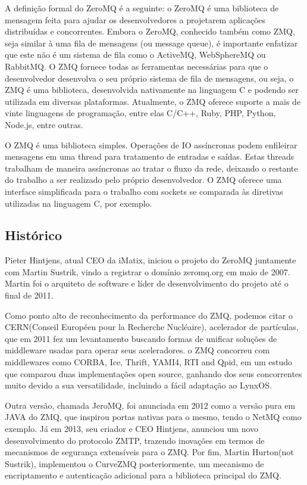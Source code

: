 \documentclass[12pt]{article}
\begin{document}
	A definição formal do ZeroMQ é a seguinte: o ZeroMQ é uma biblioteca de mensagem feita para ajudar os desenvolvedores a projetarem aplicações distribuídas e concorrentes. Embora o ZeroMQ, conhecido também como ZMQ, seja similar à uma fila de mensagens (ou message queue), é importante enfatizar que este não é um sistema de fila como o ActiveMQ, WebSphereMQ ou RabbitMQ. O ZMQ fornece todas as ferramentas necessárias para que o desenvolvedor desenvolva o seu próprio sistema de fila de mensagens, ou seja, o ZMQ é uma biblioteca, desenvolvida nativamente na linguagem C e podendo ser utilizada em diversas plataformas. Atualmente, o ZMQ oferece suporte a mais de vinte linguagens de programação, entre elas C/C++, Ruby, PHP, Python, Node.js, entre outras.

	O ZMQ é uma biblioteca simples. Operações de IO assíncronas podem enfileirar mensagens em uma thread para tratamento de entradas e saídas. Estas threads trabalham de maneira assíncronas ao tratar o fluxo da rede, deixando o restante do trabalho a ser realizado pelo próprio desenvolvedor. O ZMQ oferece uma interface simplificada para o trabalho com sockets se comparada às diretivas utilizadas na linguagem C, por exemplo.

\subsection{Histórico}
	Pieter Hintjens, atual CEO da iMatix, iniciou o projeto do ZeroMQ juntamente com Martin Sustrik, vindo a registrar o domínio zeromq.org em maio de 2007. Martin foi o arquiteto de software e líder de desenvolvimento do projeto até o final de 2011. 

	Como ponto alto de reconhecimento da performance do ZMQ, podemos citar o CERN(Conseil Européen pour la Recherche Nucléaire), acelerador de partículas, que em 2011 fez um levantamento buscando formas de unificar soluções de middleware usadas para operar seus aceleradores. o ZMQ concorreu com middlewares como CORBA, Ice, Thrift, YAMI4, RTI and Qpid, em um estudo que comparou duas implementações open source, ganhando dos seus concorrentes muito devido a sua versatilidade, incluindo a fácil adaptação ao LynxOS.

	Outra versão, chamada JeroMQ, foi anunciada em 2012 como a versão pura em JAVA do ZMQ, que inspirou portas nativas para o mesmo, tendo o NetMQ como exemplo. Já em 2013, seu criador e CEO Hintjens, anunciou um novo desenvolvimento do protocolo ZMTP, trazendo inovações em termos de mecanismos de segurança extensíveis para o ZMQ. Por fim, Martin Hurton(not Sustrik), implementou o CurveZMQ posteriormente, um mecanismo de encriptamento e autenticação adicional para a biblioteca principal do ZMQ.
\end{document}
